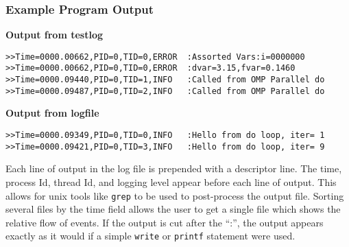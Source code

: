 \subsubsection{Example Program Output}

\noindent
{\bf Output from testlog}
\begin{verbatim}
>>Time=0000.00662,PID=0,TID=0,ERROR  :Assorted Vars:i=0000000
>>Time=0000.00662,PID=0,TID=0,ERROR  :dvar=3.15,fvar=0.1460
>>Time=0000.09440,PID=0,TID=1,INFO   :Called from OMP Parallel do
>>Time=0000.09487,PID=0,TID=2,INFO   :Called from OMP Parallel do
\end{verbatim}

\noindent
{\bf Output from logfile}
\begin{verbatim}
>>Time=0000.09349,PID=0,TID=0,INFO   :Hello from do loop, iter= 1
>>Time=0000.09421,PID=0,TID=3,INFO   :Hello from do loop, iter= 9
\end{verbatim}

Each line of output in the log file is prepended with a descriptor line.  The time,
process Id, thread Id, and logging level appear before each 
line of output.  This allows for unix tools like {\tt grep} to be used to 
post-process the output file.  Sorting several files by the time field allows the user
to get a single file which shows the relative flow of events.  If
the output is cut after the ``:'', the output appears exactly as it would if a simple
{\tt write} or {\tt printf} statement were used.

